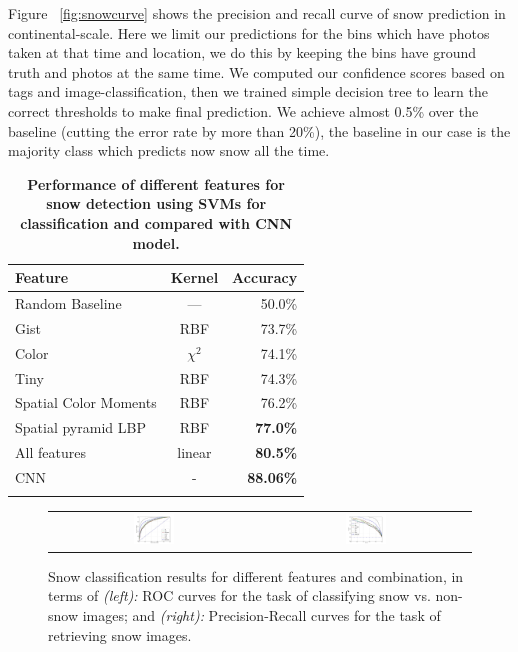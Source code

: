 Figure ~\ref{fig:snowcurve} shows the precision and recall curve of snow prediction in 
continental-scale.
Here we limit our predictions for the bins which have photos taken at that 
time and location, we do this by keeping the bins have ground truth and photos at the same time. 
We computed our confidence scores based on tags and image-classification, then we trained 
simple decision tree to learn the correct thresholds to make final prediction. We achieve 
almost 0.5\% over the baseline (cutting the error rate by more than 20\%), the baseline in 
our case is the majority class which predicts now snow all the time. 



\begin{table}\centering
\caption{\textbf{Performance of different features for snow detection using SVMs for classification and compared with CNN model.}}
\label{tab:snow}
\tiny
\begin{tabular}{@{}lcr@{}}\toprule
Feature & Kernel & Accuracy\\\midrule
Random Baseline & --- & 50.0\%\\
Gist & RBF & 73.7\%\\
Color  & $\chi^2$ & 74.1\%\\
Tiny & RBF & 74.3\%\\
Spatial Color Moments & RBF & 76.2\%\\
Spatial pyramid LBP & RBF &\textbf{77.0\%}\\\midrule
All features  & linear & \textbf{80.5\%}\\
CNN& -& \textbf{88.06\%}\\
\bottomrule\\
\end{tabular}
\end{table}


\begin{figure}[th!]
\begin{center}
\vspace{-16pt}
\begin{tabular}{cc}
 \includegraphics[width=0.2\textwidth]{figure/ROC-CNN-curves.jpg} &
\includegraphics[width=0.2\textwidth]{figure/PR-CNN-curves.jpg} \\
\end{tabular}
\end{center}
\vspace{-8pt}
\caption{
Snow classification results for different features and combination, in terms of {\textit{(left):}} ROC curves for the task of classifying snow vs. non-snow images; and 
{\textit{(right):}} Precision-Recall curves for the task of retrieving snow images.
}
\label{fig:PR_ROC_snow}
\end{figure}


